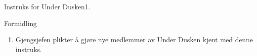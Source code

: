 \begin{instruks}{Instruks for Under Dusken}{1. }{ }
    \begin{instruksledd}{Formidling}
        \begin{enumerate}
            \item Gjengsjefen plikter å gjøre nye medlemmer av Under Dusken kjent med denne
                instruks.
        \end{enumerate}
    \end{instruksledd}


\end{instruks}


